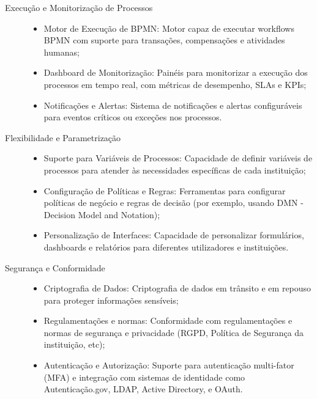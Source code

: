 \begin{description}
    \item[Execução e Monitorização de Processos] 
        \begin{itemize}
            \item Motor de Execução de BPMN: Motor capaz de executar workflows BPMN com suporte 
            para transações, compensações e atividades humanas;
            \item Dashboard de Monitorização: Painéis para monitorizar a execução dos processos 
            em tempo real, com métricas de desempenho, SLAs e KPIs;
            \item Notificações e Alertas: Sistema de notificações e alertas configuráveis para 
            eventos críticos ou exceções nos processos.
        \end{itemize}

    \item[Flexibilidade e Parametrização] 
        \begin{itemize}
            \item Suporte para Variáveis de Processos: Capacidade de definir variáveis de processos 
            para atender às necessidades específicas de cada instituição;
            \item Configuração de Políticas e Regras: Ferramentas para configurar políticas de 
            negócio e regras de decisão (por exemplo, usando DMN - Decision Model and Notation);
            \item Personalização de Interfaces: Capacidade de personalizar formulários, dashboards 
            e relatórios para diferentes utilizadores e instituições.
        \end{itemize}

    \item[Segurança e Conformidade] 
        \begin{itemize}
            \item Criptografia de Dados: Criptografia de dados em trânsito e em repouso para 
            proteger informações sensíveis;
            \item Regulamentações e normas: Conformidade com regulamentações e normas de segurança 
            e privacidade (RGPD, Política de Segurança da instituição, etc);
            \item Autenticação e Autorização: Suporte para autenticação multi-fator (MFA) e 
            integração com sistemas de identidade como Autenticação.gov, LDAP, Active Directory, e OAuth.
        \end{itemize}  
\end{description}

